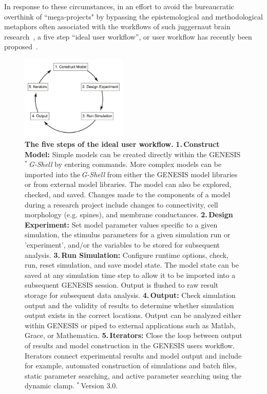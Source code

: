 \documentclass[11pt,3p,twocolumn]{JMN}
\begin{document}
In response to these circumstances, in an effort to avoid the bureaucratic overthink of ``mega-projects" by bypassing the epistemological and methodological metaphors often associated with the workflows of such juggernaut brain research~\citep{fan19}, a five step “ideal user workflow”, or user workflow has recently been proposed~\citep{cornelis12}. 

\begin{figure}[h!t]
  \begin{center}
    \includegraphics[width=0.45\textwidth]{figures/user-workflow.pdf}
  \end{center}
  \vspace*{-\lineskip}
  \caption{ \small{{\bf The five steps of the ideal user workflow.} {\textbf{1.\,Construct Model:} Simple models can be created directly within the GENESIS$^*$\,\textit{G-Shell} by entering commands. More complex models can be imported into the\,\textit{G-Shell} from either the GENESIS model libraries or from external model libraries. The model can also be explored, checked, and saved. Changes made to the components of a model during a research project include changes to connectivity, cell morphology (e.g. spines), and membrane conductances. \textbf{2.\,Design Experiment:} Set model parameter values specific to a given simulation, the stimulus parameters for a given simulation run or 'experiment', and/or the variables to be stored for subsequent analysis.} \textbf{3.\,Run Simulation:} Configure runtime options, check, run, reset simulation, and save model state. The model state can be saved at any simulation time step to allow it to be imported into a subsequent GENESIS session. Output is flushed to raw result storage for subsequent data analysis. \textbf{4.\,Output:} Check simulation output and the validity of results to determine whether simulation output exists in the correct locations. Output can be analyzed either within GENESIS or piped to external applications such as Matlab, Grace, or Mathematica. \textbf{5.\,Iterators:} Close the loop between output of results and model construction in the GENESIS users workflow. Iterators connect experimental results and model output and include for example, automated construction of simulations and batch files, static parameter searching, and active parameter searching using the dynamic clamp. $^*$\,Version 3.0.}}
  \label{fig:user-workflow}
\end{figure}
\end{document}
